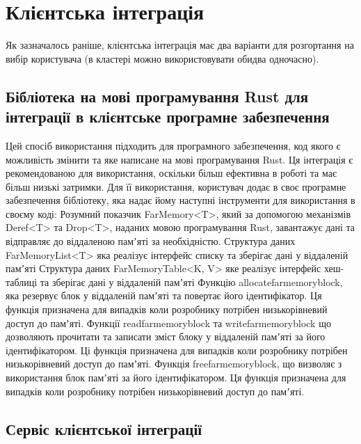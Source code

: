 \documentclass[14pt]{article}
\begin{document}
\section {Клієнтська інтеграція}

Як зазначалось раніше, клієнтська інтеграція має два варіанти для розгортання на вибір користувача (в кластері можно використовувати обидва одночасно).

\subsection{Бібліотека на мові програмування Rust для інтеграції в клієнтське програмне забезпечення}

Цей спосіб використання підходить для програмного забезпечення, код якого є можливість змінити та яке написане на мові програмування Rust. Ця інтеграція є рекомендованою для використання, оскільки більш ефективна в роботі та має більш низькі затримки.
	Для її використання, користувач додає в своє програмне забезпечення бібліотеку, яка надає йому наступні інструменти для використання в своєму коді:
Розумний показчик FarMemory<T>, який за допомогою механізмів Deref<T> та Drop<T>, наданих мовою програмування Rust, завантажує дані та відправляє до віддаленою памʼяті за необхідністю.
Структура даних FarMemoryList<T> яка реалізує інтерфейс списку та зберігає дані у віддаленій памʼяті
Структура даних FarMemoryTable<K, V> яке реалізує інтерфейс хеш-таблиці та зберігає дані у віддаленій памʼяті
Функцію allocate\textunderscore far\textunderscore memory\textunderscore block, яка резервує блок у віддаленій памʼяті та повертає його ідентифікатор. Ця функція призначена для випадків коли розробнику потрібен низькорівневий доступ до памʼяті.
Функції read\textunderscore far\textunderscore memory\textunderscore block та write\textunderscore far\textunderscore memory\textunderscore block що дозволяють прочитати та записати зміст блоку у віддаленій памʼяті за його ідентифікатором. Ці функція призначена для випадків коли розробнику потрібен низькорівневий доступ до памʼяті.
Функція free\textunderscore far\textunderscore memory\textunderscore block, що визволяє з використання блок памʼяті за його ідентифікатором. Ця функція призначена для випадків коли розробнику потрібен низькорівневий доступ до памʼяті.

\subsection {Сервіс клієнтської інтеграції}
\end{document}
